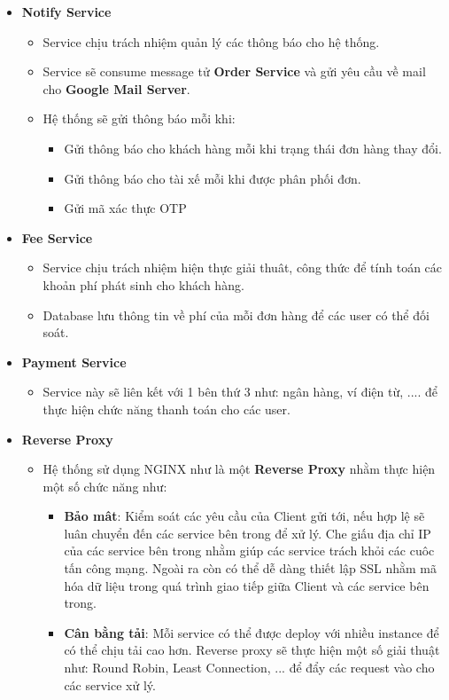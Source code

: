 \begin{itemize}
\begin{itemize}
			\end{itemize}
			\item \textbf{Notify Service}
			\begin{itemize}
				\item Service chịu trách nhiệm quản lý các thông báo cho hệ thống.
				\item Service sẽ consume message tử \textbf{Order Service} và gửi yêu cầu về mail cho \textbf{Google Mail Server}.
				\item Hệ thống sẽ gửi thông báo mỗi khi: 
					\begin{itemize}
						\item Gửi thông báo cho khách hàng mỗi khi trạng thái đơn hàng thay đổi. 
						\item Gửi thông báo cho tài xế mỗi khi được phân phối đơn.
						\item Gửi mã xác thực OTP
					\end{itemize}
			\end{itemize}
			\item \textbf{Fee Service}
			\begin{itemize}
				\item Service chịu trách nhiệm hiện thực giải thuât, công thức để tính toán các khoản phí phát sinh cho khách hàng.
				\item Database lưu thông tin về phí của mỗi đơn hàng để các user có thể đối soát.
			\end{itemize}
			\item \textbf{Payment Service}
			\begin{itemize}
				\item Service này sẽ liên kết với 1 bên thứ 3 như: ngân hàng, ví điện từ, .... để thực hiện chức năng thanh toán cho các user.
			\end{itemize}
			\item \textbf{Reverse Proxy}
			\begin{itemize}
				\item Hệ thống sử dụng NGINX như là một \textbf{Reverse Proxy} nhằm thực hiện một số chức năng như: 
				\begin{itemize}
					\item \textbf{Bảo mât}: Kiểm soát các yêu cầu của Client gửi tới, nếu hợp lệ sẽ luân chuyển đến các service bên trong để xử lý. Che giấu địa chỉ IP của các service bên trong nhằm giúp các service trách khỏi các cuôc tấn công mạng. Ngoài ra còn có thể dễ dàng thiết lập SSL nhằm mã hóa dữ liệu trong quá trình giao tiếp giữa Client và các service bên trong.
					\item \textbf{Cân bằng tải}: Mỗi service có thể được deploy với nhiều instance để có thể chịu tải cao hơn. Reverse proxy sẽ thực hiện một số giải thuật như: Round Robin, Least Connection, ... để đẩy các request vào cho các service xử lý.
				\end{itemize}
			\end{itemize}
			

\end{itemize}
